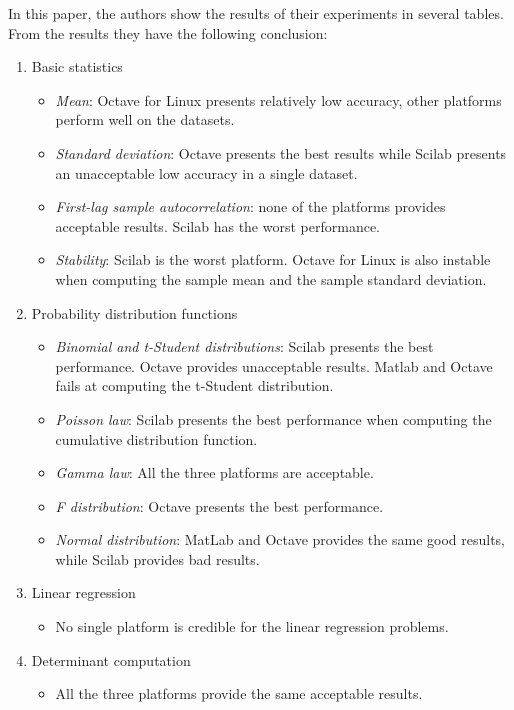 \documentclass[conference,onecolumn]{IEEEtran}
\begin{document}
In this paper, the authors show the results of their experiments in several tables. From the results they have the following conclusion:
\begin{enumerate}
	\item Basic statistics
	\begin{itemize}
		\item \textit{Mean}: Octave for Linux presents relatively low accuracy, other platforms perform well on the datasets.
		\item \textit{Standard deviation}: Octave presents the best results while Scilab presents an unacceptable low accuracy in a single dataset.
		\item \textit{First-lag sample autocorrelation}: none of the platforms provides acceptable results. Scilab has the worst performance.
		\item \textit{Stability}: Scilab is the worst platform. Octave for Linux is also instable when computing the sample mean and the sample standard deviation.
	\end{itemize}
	
	\item Probability distribution functions
	\begin{itemize}
		\item \textit{Binomial and t-Student distributions}: Scilab presents the best performance. Octave provides unacceptable results. Matlab and Octave fails at computing the t-Student distribution.
		\item \textit{Poisson law}: Scilab presents the best performance when computing the cumulative distribution function.
		\item \textit{Gamma law}: All the three platforms are acceptable.
		\item \textit{F distribution}: Octave presents the best performance.
		\item \textit{Normal distribution}: MatLab and Octave provides the same good results, while Scilab provides bad results.
	\end{itemize}

	\item Linear regression
	\begin{itemize}
		\item No single platform is credible for the linear regression problems.
	\end{itemize}

	\item Determinant computation
	\begin{itemize}
		\item All the three platforms provide the same acceptable results.
	\end{itemize}


\end{enumerate}
\end{document}
